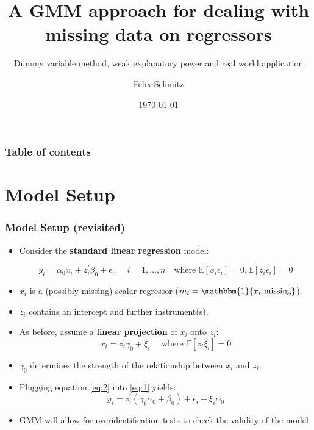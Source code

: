 \documentclass[aspectratio=1610]{beamer}
\title{A GMM approach for dealing with missing data on regressors}
\subtitle{Dummy variable method, weak explanatory power and real world application}
\date{\today}
\author{Felix Schmitz}
\begin{document}

\begin{frame}[plain]
	\titlepage
\end{frame}

\begin{framecontent}
	\frametitle{Table of contents}
\end{framecontent}

\section{Model Setup}

\begin{frame}
    \frametitle{Model Setup (revisited)}
    \begin{itemize}
        \item<1-> Consider the \textbf{standard linear regression} model:

        \begin{equation}\label{eq:1}
            y_i = \alpha_0 x_i + z_i^{\prime} \beta_0 + \epsilon_i, \quad i= 1,\ldots,n \quad \text{where }  \mathbb{E}[x_i \epsilon_i] = 0, \mathbb{E}[z_i \epsilon_i] = 0
        \end{equation}

        \item<1-> $x_i$ is a (possibly missing) scalar regressor (\( m_i = \mathbbm{1}\{x_i \text{ missing}\} \)).
		\item<1-> $z_i$ contains an intercept and further instrument(s).
        \item<2-> As before, assume a \textbf{linear projection} of $x_i$ onto $z_i$:
        \begin{equation}\label{eq:2}
            x_i = z_i^{\prime} \gamma_0 + \xi_i \quad \text{ where } \mathbb{E}[z_i \xi_i] = 0
        \end{equation}

        \item<3-> $\gamma_0$ determines the strength of the relationship between $x_i$ and $z_i$.
        \item<3-> Plugging equation \eqref{eq:2} into \eqref{eq:1} yields:
        \begin{equation}\label{eq:3}
            y_i = z_i^{\prime} (\gamma_0 \alpha_0 + \beta_0) + \epsilon_i + \xi_i \alpha_0
        \end{equation}
		\item<4-> GMM will allow for overidentification tests to check the validity of the model
    \end{itemize}
\end{frame}
\end{document}
